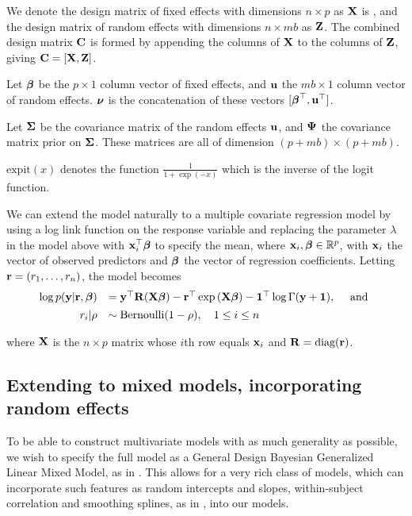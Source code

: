 We denote the design matrix of fixed effects with dimensions $n \times p$ as
${\bf X}$ is , and the design matrix of random  effects with dimensions $n \times m
b$ as ${\bf Z}$. The combined design matrix ${\bf C}$ is formed by appending the
columns of ${\bf X}$ to the columns of ${\bf Z}$, giving ${\bf C} = [ {\bf X}, {\bf Z} ]$.

Let ${\boldsymbol \beta}$ be the $p \times 1$ column vector of fixed effects, and ${\bf u}$ the
$m b \times 1$ column vector of random effects. ${\boldsymbol \nu}$ is the concatenation of
these vectors $[{\boldsymbol \beta}^\top, {\bf u}^\top]$.

Let ${\boldsymbol \Sigma}$ be the covariance matrix of the random effects ${\bf u}$, and ${\boldsymbol \Psi}$
the covariance matrix prior on ${\boldsymbol \Sigma}$.  These matrices are all of dimension
$(p + m b) \times (p + m b)$.

$\text{expit}(x)$ denotes the function $\tfrac{1}{1 + \exp(-x)}$ which is the
inverse of the logit function.

We can extend the model naturally to a multiple covariate regression model by
using a log link function on the response variable and replacing the parameter
$\lambda$ in the model above with ${\bf x}_i^\top {\boldsymbol\beta}$ to specify the mean,
where ${\bf x}_i,{\boldsymbol \beta} \in {\mathbb{R}}^p$, with ${\bf x}_i$ the vector of observed predictors
and ${\boldsymbol \beta}$ the vector of regression coefficients. Letting ${\bf r} =
(r_1,\ldots,r_n)$, the model becomes
\begin{equation*}%
	\begin{array}{rl}
		\log p(\vy|\vr, \vbeta) 
		    & = \vy^\top \mR (\mX\vbeta)                           
		- \vr^\top \exp{(\mX\vbeta)} 
		- \vone^\top \log{\Gamma{(\vy + \vone)}}, \quad \mbox{ and }\\ [1ex]
		r_i | \rho & \sim \text{Bernoulli}(1-\rho), \quad 1 \leq i \leq n \\
	\end{array}
\end{equation*}

\noindent where ${\bf X}$ is the $n\times p$ matrix whose $i$th row equals ${\bf x}_i$
and ${\bf R} = \text{diag}{({\bf r})}$.

\subsection{Extending to mixed models, incorporating random effects}

To be able to construct multivariate models with as much generality as
possible, we wish to specify the full model as a General Design Bayesian
Generalized Linear Mixed Model, as in \cite{Zhao2006}. This allows for a very
rich class of models, which can incorporate such features as random intercepts
and slopes, within-subject correlation and smoothing splines, as in
\cite{Wand2008}, into our models.

